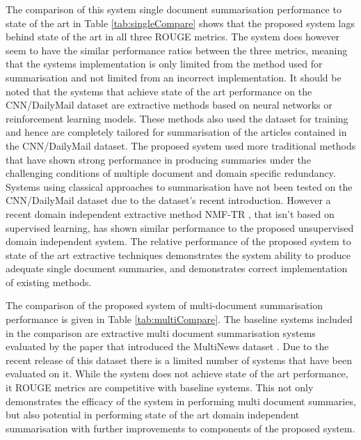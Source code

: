 The comparison of this system single document summarisation performance to state of the art in Table \ref{tab:singleCompare} shows that the proposed system lags behind state of the art in all three ROUGE metrics. The system does however seem to have the similar performance ratios between the three metrics, meaning that the systems implementation is only limited from the method used for summarisation and not limited from an incorrect implementation. It should be noted that the systems that achieve state of the art performance on the CNN/DailyMail dataset are extractive methods based on neural networks or reinforcement learning models. These methods also used the dataset for training and hence are completely tailored for summarisation of the articles contained in the CNN/DailyMail dataset. The proposed system used more traditional methods that have shown strong performance in producing summaries under the challenging conditions of multiple document and domain specific redundancy. Systems using classical approaches to summarisation have not been tested on the CNN/DailyMail dataset due to the dataset’s recent introduction. However a recent domain independent extractive method NMF-TR \citep{khurana2019extractive}, that isn’t based on supervised learning, has shown similar performance to the proposed unsupervised domain independent system. The relative performance of the proposed system to state of the art extractive techniques demonstrates the system ability to produce adequate single document summaries, and demonstrates correct implementation of existing methods.

The comparison of the proposed system of multi-document summarisation performance is given in Table \ref{tab:multiCompare}. The baseline systems included in the comparison are extractive multi document summarisation systems evaluated by the paper that introduced the MultiNews dataset \citep{fabbri2019multi}. Due to the recent release of this dataset there is a limited number of systems that have been evaluated on it.  While the system does not achieve state of the art performance, it ROUGE metrics are competitive with baseline systems. This not only demonstrates the efficacy of the system in performing multi document summaries, but also potential in performing state of the art domain independent summarisation with further improvements to components of the proposed system.

